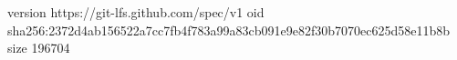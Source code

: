 version https://git-lfs.github.com/spec/v1
oid sha256:2372d4ab156522a7cc7fb4f783a99a83cb091e9e82f30b7070ec625d58e11b8b
size 196704

